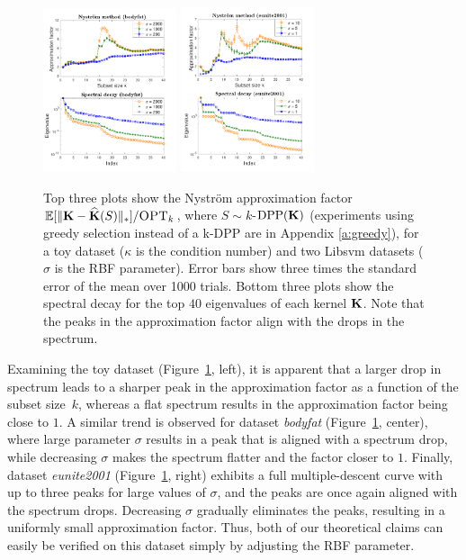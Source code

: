 \documentclass{article}
\begin{document}
\begin{figure}[t]
   \hspace{-6mm}
  \includegraphics[width=0.35\textwidth]{figs/nystrom/rbf-bodyfat-double}
  \hspace{-6mm}
  \includegraphics[width=0.35\textwidth]{figs/nystrom/rbf-eunite2001-double}
  \vspace{-4mm}
  \fi
  \caption{Top three plots show the Nystr\"om approximation factor $\mathbb E[\|\mathbf K-{\widehat{\mathbf K}}(S)\|_*]/{\textsc{OPT}_k}$,
    where $S\sim k$-${\mathrm{DPP}}(\mathbf K)$ (experiments using greedy selection
    instead of a k-DPP are in Appendix \ref{a:greedy}), for a toy dataset
    ($\kappa$ is the condition number) and two
    Libsvm datasets ($\sigma$ is the RBF parameter). Error bars show three times the standard
    error  of the mean over 1000 trials. Bottom three plots show the spectral decay for  the
  top $40$ eigenvalues  of each kernel $\mathbf K$. Note that the
  peaks in the approximation factor align with the drops in
  the spectrum.}
\vspace{-2mm}
  \label{f:rbf}
\end{figure}


Examining the toy dataset (Figure~\ref{f:rbf}, left), it is apparent
that a larger drop in spectrum leads to a sharper peak in the
approximation factor as a function of the subset size~$k$, whereas a flat spectrum results in  
the approximation factor being close to $1$. A similar trend is observed for
dataset \emph{bodyfat} (Figure~\ref{f:rbf}, center), where large
parameter $\sigma$ results in a peak that is aligned with a spectrum
drop, while 
decreasing $\sigma$ makes the spectrum flatter and the factor closer to
$1$. Finally, dataset \emph{eunite2001} (Figure~\ref{f:rbf}, right) exhibits a full
multiple-descent curve with up to three peaks for large values of
$\sigma$, and the peaks are once again aligned with the spectrum
drops. Decreasing $\sigma$ gradually eliminates the peaks, 
resulting in a uniformly small approximation factor. Thus, both of our theoretical
claims can easily be verified on this dataset simply by adjusting the RBF parameter.
\end{document}
